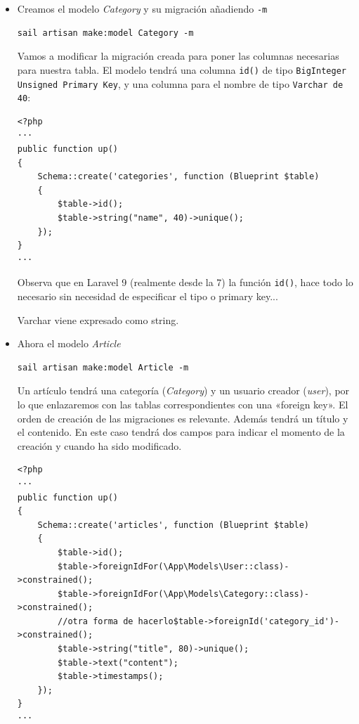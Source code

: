 \documentclass[11pt]{article}
\begin{document}
\begin{itemize}
\item Creamos el modelo \emph{Category} y su migración añadiendo \texttt{-m}
\label{sec:org685e3d7}
\begin{verbatim}
sail artisan make:model Category -m
\end{verbatim}

Vamos a modificar la migración creada para poner las columnas
necesarias para nuestra tabla. El modelo tendrá una columna \texttt{id()} de
tipo \texttt{BigInteger Unsigned Primary Key}, y una columna para el nombre
de tipo \texttt{Varchar de 40}:
\begin{verbatim}
<?php
···
public function up()
{
    Schema::create('categories', function (Blueprint $table)
    {
        $table->id();
        $table->string("name", 40)->unique();
    });
}
···
\end{verbatim}

Observa que en Laravel 9 (realmente desde la 7) la función \texttt{id()},
hace todo lo necesario sin necesidad de especificar el tipo o primary
key...

Varchar viene expresado como string.

\item Ahora el modelo \emph{Article}
\label{sec:orgf3eaacc}
\begin{verbatim}
sail artisan make:model Article -m
\end{verbatim}

Un artículo tendrá una categoría (\emph{Category}) y un usuario creador
(\emph{user}), por lo que enlazaremos con las tablas correspondientes con
una «foreign key». El orden de creación de las migraciones es
relevante. Además tendrá un título y el contenido. En este caso tendrá
dos campos para indicar el momento de la creación y cuando ha sido
modificado.

\begin{verbatim}
<?php
···
public function up()
{
    Schema::create('articles', function (Blueprint $table)
    {
        $table->id();
        $table->foreignIdFor(\App\Models\User::class)->constrained();
        $table->foreignIdFor(\App\Models\Category::class)->constrained();
        //otra forma de hacerlo$table->foreignId('category_id')->constrained();
        $table->string("title", 80)->unique();
        $table->text("content");
        $table->timestamps();
    });
}
···
\end{verbatim}
\end{itemize}
\end{document}
